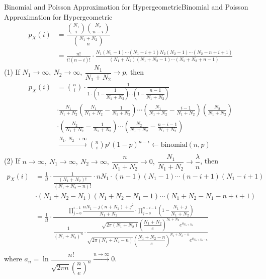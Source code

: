 \documentclass{elegantbook}
\begin{document}
\begin{remark}{Binomial and Poisson Approximation for Hypergeometric}{Binomial and Poisson Approximation for Hypergeometric}
$$
\begin{aligned}
p_X\left(i\right)&=\dfrac{\binom{N_1}{i}\binom{N_2}{n-i}}{\binom{N_1+N_2}{n}}\\
&=\frac{n!}{i!\left(n-i\right)!}\cdot\frac{N_1\left(N_1-1\right)\cdots\left(N_1-i+1\right)N_2\left(N_2-1\right)\cdots(N_2-n+i+1)}{\left(N_1+N_2\right)\left(N_1+N_2-1\right)\cdots(N_1+N_2+n-1)}
\end{aligned}
$$
(1) If $N_1\rightarrow\infty,\ N_2\rightarrow\infty,\ \dfrac{N_1}{N_1+N_2}\rightarrow p$, then
$$\begin{aligned}
p_X\left(i\right)&=\binom{n}{i}\cdot\frac{1}{1\cdot\left(1-\dfrac{1}{N_1+N_2}\right)\cdots\left(1-\dfrac{n-1}{N_1+N_2}\right)}\\
&\cdot\frac{N_1}{N_1+N_2}\left(\frac{N_1}{N_1+N_2}-\frac{1}{N_1+N_2}\right)\cdots\left(\frac{N_1}{N_1+N_2}-\frac{i-1}{N_1+N_2}\right)\left(\frac{N_2}{N_1+N_2}\right)\\
&\cdot\left(\frac{N_2}{N_1+N_2}-\frac{1}{N_1+N_2}\right)\cdots\left(\frac{N_2}{N_1+N_2}-\frac{n-i-1}{N_1+N_2}\right)\\
&\xrightarrow{N_1,\ N_2\rightarrow\infty}\binom{n}{i}p^i(1-p)^{n-i}\leftarrow\mathrm{binomial}(n,p)\\
\end{aligned}
$$
(2) If $n\rightarrow\infty,\ N_1\rightarrow\infty,\ N_2\rightarrow\infty,\ \dfrac{n}{N_1+N_2}\rightarrow0,\ \dfrac{N_1}{N_1+N_2}\rightarrow\dfrac{\lambda}{n}$, then
$$\begin{aligned}
p_X\left(i\right)&=\frac{1}{i!}\cdot\frac{1}{\dfrac{\left(N_1+N_2\right)!}{\left(N_1+N_2-n\right)!}}\cdot nN_1\cdot\left(n-1\right)\left(N_1-1\right)\cdots\left(n-i+1\right)\left(N_1-i+1\right)\\ 
&\cdot(N_1+N_2-N_1)(N_1+N_2-N_1-1)\cdots(N_1+N_2-N_1-n+i+1)
\\
&=\frac{1}{i!}\cdot\frac{\prod\limits_{j=0}^{i-1}{\dfrac{nN_1-j\left(n+N_1\right)+j^2}{N_1+N_2}\cdot\prod\limits_{j=0}^{n-i-1}\left(1-\dfrac{N_1+j}{N_1+N_2}\right)}}{\dfrac{1}{(N_1+N_2)^n}\cdot\dfrac{\sqrt{2\pi\left(N_1+N_2\right)}\left(\dfrac{N_1+N_2}{e}\right)^{N_1+N_2}e^{a_{N_1+N_2}}}{\sqrt{2\pi\left(N_1+N_2-n\right)}\left(\dfrac{N_1+N_2-n}{e}\right)^{N_1+N_2-n}e^{a_{N_1+N_2-n}}}}\\
\end{aligned}
$$
where $a_n=\ln{\dfrac{n!}{\sqrt{2\pi n}\left(\dfrac{n}{e}\right)^n}}\xrightarrow{n\rightarrow\infty}0.\ $

\end{remark}
\end{document}
